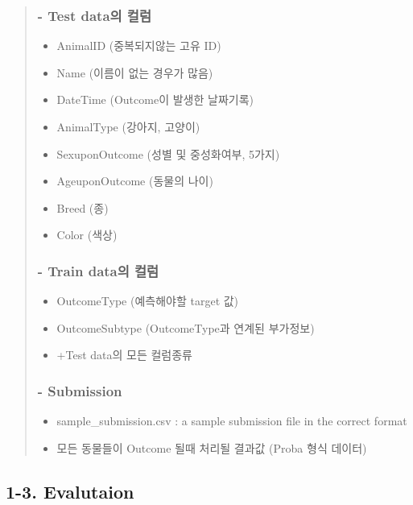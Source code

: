 \documentclass[11pt]{article}
\providecommand{\tightlist}{%
      \setlength{\itemsep}{0pt}\setlength{\parskip}{0pt}}
\begin{document}
    \begin{quote}
\subsubsection{- Test data의 컬럼}\label{test-datauxc758-uxceecuxb7fc}

\begin{itemize}
\tightlist
\item
  AnimalID (중복되지않는 고유 ID)
\item
  Name (이름이 없는 경우가 많음)
\item
  DateTime (Outcome이 발생한 날짜기록)
\item
  AnimalType (강아지, 고양이)
\item
  SexuponOutcome (성별 및 중성화여부, 5가지)
\item
  AgeuponOutcome (동물의 나이)
\item
  Breed (종)
\item
  Color (색상)
\end{itemize}

\subsubsection{- Train data의 컬럼}\label{train-datauxc758-uxceecuxb7fc}

\begin{itemize}
\tightlist
\item
  OutcomeType (예측해야할 target 값)
\item
  OutcomeSubtype (OutcomeType과 연계된 부가정보)
\item
  +Test data의 모든 컬럼종류
\end{itemize}

\subsubsection{- Submission}\label{submission}

\begin{itemize}
\tightlist
\item
  sample\_submission.csv : a sample submission file in the correct
  format
\item
  모든 동물들이 Outcome 될때 처리될 결과값 (Proba 형식 데이터)
\end{itemize}
\end{quote}

    \subsection{1-3. Evalutaion}\label{evalutaion}
\end{document}
